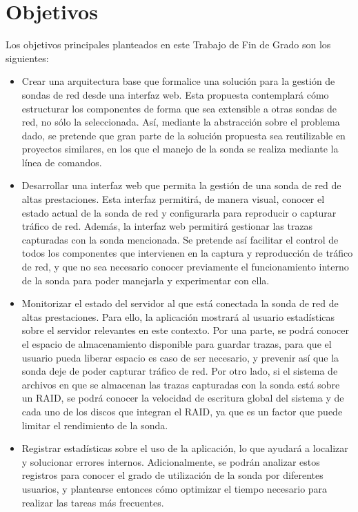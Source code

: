 \section{Objetivos}

Los objetivos principales planteados en este Trabajo de Fin de Grado son los siguientes:

\begin{itemize}
  \item Crear una arquitectura base que formalice una solución para la gestión de sondas de red desde una interfaz web.
  Esta propuesta contemplará cómo estructurar los componentes de forma que sea extensible a otras sondas de red, no sólo la seleccionada.
  Así, mediante la abstracción sobre el problema dado, se pretende que gran parte de la solución propuesta sea reutilizable en proyectos similares, en los que el manejo de la sonda se realiza mediante la línea de comandos.

  \item Desarrollar una interfaz web que permita la gestión de una sonda de red de altas prestaciones.
  Esta interfaz permitirá, de manera visual, conocer el estado actual de la sonda de red y configurarla para reproducir o capturar tráfico de red.
  Además, la interfaz web permitirá gestionar las \glspl{traza} capturadas con la sonda mencionada.
  Se pretende así facilitar el control de todos los componentes que intervienen en la captura y reproducción de tráfico de red, y que no sea necesario conocer previamente el funcionamiento interno de la sonda para poder manejarla y experimentar con ella.

  \item Monitorizar el estado del servidor al que está conectada la sonda de red de altas prestaciones.
  Para ello, la aplicación mostrará al usuario estadísticas sobre el servidor relevantes en este contexto.
  Por una parte, se podrá conocer el espacio de almacenamiento disponible para guardar \glspl{traza}, para que el usuario pueda liberar espacio es caso de ser necesario, y prevenir así que la sonda deje de poder capturar tráfico de red.
  Por otro lado, si el sistema de archivos en que se almacenan las \glspl{traza} capturadas con la sonda está sobre un \gls{RAID}, se podrá conocer la velocidad de escritura global del sistema y de cada uno de los discos que integran el \gls{RAID}, ya que es un factor que puede limitar el rendimiento de la sonda.

  \item Registrar estadísticas sobre el uso de la aplicación, lo que ayudará a localizar y solucionar errores internos.
  Adicionalmente, se podrán analizar estos registros para conocer el grado de utilización de la sonda por diferentes usuarios, y plantearse entonces cómo optimizar el tiempo necesario para realizar las tareas más frecuentes.
\end{itemize}

